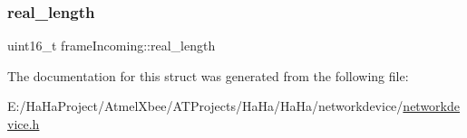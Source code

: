 \mbox{\label{structframe_incoming_ab3c01fe000d5c79de04c5a3bcbdc8c9d}} 
\subsubsection{\texorpdfstring{real\+\_\+length}{real\_length}}
{\footnotesize\ttfamily uint16\+\_\+t frame\+Incoming\+::real\+\_\+length}



The documentation for this struct was generated from the following file\+:\begin{DoxyCompactItemize}
\item 
E\+:/\+Ha\+Ha\+Project/\+Atmel\+Xbee/\+A\+T\+Projects/\+Ha\+Ha/\+Ha\+Ha/networkdevice/\hyperlink{networkdevice_8h}{networkdevice.\+h}\end{DoxyCompactItemize}
